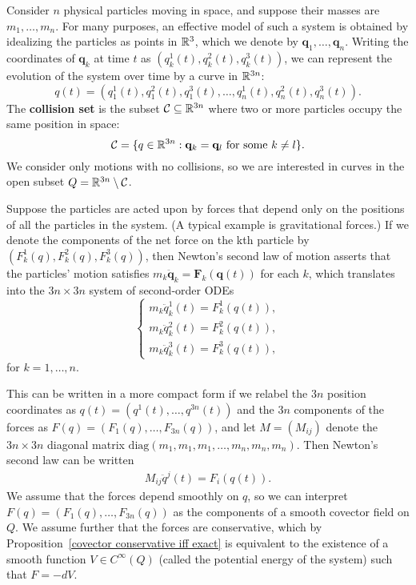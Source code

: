 \begin{example}
Consider $n$ physical particles moving in space, and suppose their masses are $m_1,\dots,m_n$. For many purposes, an effective model of such a system is obtained by idealizing the particles as points in $\mathbb{R}^3$, which we denote by $\mathbf{q}_1,\dots,\mathbf{q}_n$. Writing the coordinates of $\mathbf{q}_k$ at time $t$ as $(q_k^1(t),q_k^2(t),q_k^3(t))$, we can represent the evolution of the system over time by a curve in $\mathbb{R}^{3n}$:
\[q(t)=(q_1^1(t),q_1^2(t),q_1^3(t),\dots,q_n^1(t),q_n^2(t),q_n^3(t)).\]
The \textbf{collision set} is the subset $\mathcal{C}\subseteq\mathbb{R}^{3n}$ where two or more particles occupy the same position in space:
\[\mathcal{C}=\{q\in\mathbb{R}^{3n}:\mathbf{q}_k=\mathbf{q}_l\text{ for some }k\neq l\}.\]
We consider only motions with no collisions, so we are interested in curves in the open subset $Q=\mathbb{R}^{3n}\setminus\mathcal{C}$.\par
Suppose the particles are acted upon by forces that depend only on the positions of all the particles in the system. (A typical example is gravitational forces.) If we denote the components of the net force on the kth particle by $(F_k^1(q),F_k^2(q),F_k^3(q))$, then Newton's second law of motion asserts that the particles' motion satisfies $m_k\ddot{\mathbf{q}}_k=\mathbf{F}_k(\mathbf{q}(t))$ for each $k$, which translates into the $3n\times 3n$ system of second-order ODEs
\begin{equation*}
\left\{
\begin{array}{l}
m_k\ddot{q}_k^1(t)=F_k^1(q(t)),\\[8pt]
m_k\ddot{q}_k^2(t)=F_k^2(q(t)),\\[8pt]
m_k\ddot{q}_k^3(t)=F_k^3(q(t)),
\end{array}
\right.
\end{equation*}
for $k=1,\dots,n$.\par
This can be written in a more compact form if we relabel the $3n$ position coordinates as $q(t)=(q^1(t),\dots,q^{3n}(t))$ and the $3n$ components of the forces as $F(q)=(F_1(q),\dots,F_{3n}(q))$, and let $M=(M_{ij})$ denote the $3n\times 3n$ diagonal matrix $\mathrm{diag}(m_1,m_1,m_1,\dots,m_n,m_n,m_n)$. Then Newton's second law can be written
\begin{align}\label{n-body problem-1}
M_{ij}\ddot{q}^j(t)=F_i(q(t)).
\end{align}
We assume that the forces depend smoothly on $q$, so we can interpret $F(q)=(F_1(q),\dots,F_{3n}(q))$ as the components of a smooth covector field on $Q$. We assume further that the forces are conservative, which by Proposition~\ref{covector conservative iff exact} is equivalent to the existence of a smooth function $V\in C^\infty(Q)$ (called the potential energy of the system) such that $F=-dV$.\par

\end{example}
